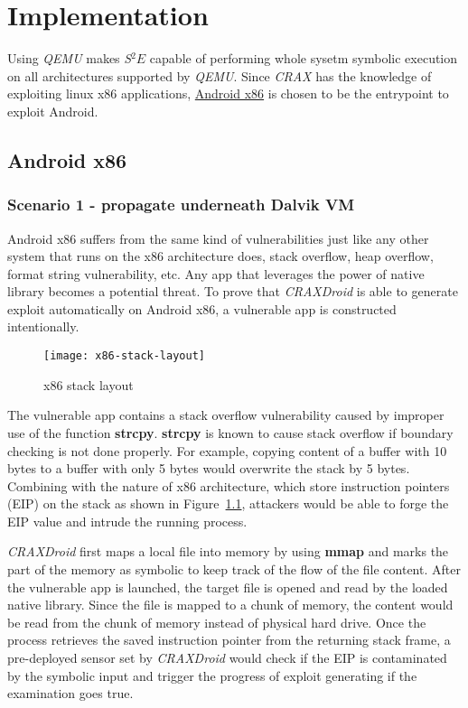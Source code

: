 \chapter{Implementation}

Using \emph{QEMU} makes \emph{S$^{2}E$} capable of performing whole sysetm
symbolic execution on all architectures supported by \emph{QEMU}. Since
\emph{CRAX} has the knowledge of exploiting linux x86 applications,
\href{http://www.android-x86.org/}{Android x86} is chosen to be the entrypoint
to exploit Android.

\section{Android x86}

\subsection{Scenario 1 - propagate underneath Dalvik VM}

Android x86 suffers from the same kind of vulnerabilities just like any other
system that runs on the x86 architecture does, stack overflow, heap overflow,
format string vulnerability, etc. Any app that leverages the power of native
library becomes a potential threat. To prove that \emph{CRAXDroid} is able to
generate exploit automatically on Android x86, a vulnerable app is constructed
intentionally.

\begin{figure}[!ht]
  \texttt{[image: x86-stack-layout]}
  \caption{x86 stack layout}
  \label{fig:x86-stack-layout}
\end{figure}

The vulnerable app contains a stack overflow vulnerability caused by improper
use of the function \textbf{strcpy}. \textbf{strcpy} is known to cause
stack overflow if boundary checking is not done properly. For example, copying
content of a buffer with 10 bytes to a buffer with only 5 bytes would overwrite
the stack by 5 bytes. Combining with the nature of x86 architecture, which
store instruction pointers (EIP) on the stack as shown in
Figure~\ref{fig:x86-stack-layout}, attackers would be able to forge the EIP
value and intrude the running process.

\emph{CRAXDroid} first maps a local file into memory by using \textbf{mmap} and
marks the part of the memory as symbolic to keep track of the flow of the file
content. After the vulnerable app is launched, the target file is opened and
read by the loaded native library. Since the file is mapped to a chunk of
memory, the content would be read from the chunk of memory instead of physical
hard drive. Once the process retrieves the saved instruction pointer from the
returning stack frame, a pre-deployed sensor set by \emph{CRAXDroid} would
check if the EIP is contaminated by the symbolic input and trigger the
progress of exploit generating if the examination goes true.

